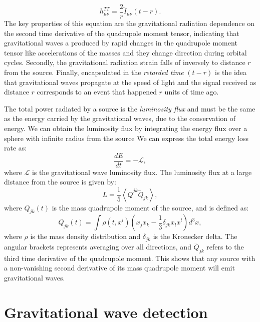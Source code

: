 %
\begin{equation}
    h^{TT}_{\mu\nu} = \frac{2}{r} \ddot{I}_{\mu\nu}(t-r).
\end{equation}
The key properties of this equation are the gravitational radiation dependence on the second time derivative of the quadrupole moment tensor, indicating that gravitational waves a produced by rapid changes in the quadrupole moment tensor like accelerations of the masses and they change direction during orbital cycles. Secondly, the gravitational radiation strain falls of inversely to distance $r$ from the source. Finally, encapsulated in the \textit{retarded time} $(t - r)$ is the idea that gravitational waves propagate at the speed of light and the signal received as distance $r$ corresponds to an event that happened $r$ units of time ago.

The total power radiated by a source is the \textit{luminosity flux}  and must be the same as the energy carried by the gravitational waves, due to the conservation of energy. We can obtain the luminosity flux by integrating the energy flux over a sphere with infinite radius from the source We can express the total energy loss rate as:
%
\begin{equation}
    \frac{dE}{dt} = -\mathcal{L},
\end{equation}
%
where $\mathcal{L}$ is the gravitational wave luminosity flux. The luminosity flux at a large distance from the source is given by:
%
\begin{equation}
    L = \frac{1}{5} \left\langle \dddot{Q}^{jk} \dddot{Q}_{jk} \right\rangle,
\end{equation}
%
where $Q_{jk}(t)$ is the mass quadrupole moment of the source, and is defined as:
%
\begin{equation}
    Q_{jk}(t) = \int \rho(t, x^i) \left( x_j x_k - \frac{1}{3} \delta_{jk} x_l x^l \right) d^3x,
\end{equation}
%
where $\rho$ is the mass density distribution and $\delta_{jk}$ is the Kronecker delta. The angular brackets represents averaging over all directions, and $\dddot{Q}_{jk}$ refers to the third time derivative of the quadrupole moment. This shows that any source with a non-vanishing second derivative of its mass quadrupole moment will emit gravitational waves.








\section{\label{1:sec:IFOs}Gravitational wave detection}

